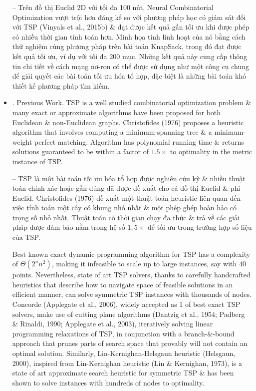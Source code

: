 \documentclass{article}
\begin{document}
\begin{itemize}
    -- Trên đồ thị Euclid 2D với tối đa 100 nút, Neural Combinatorial Optimization vượt trội hơn đáng kể so với phương pháp học có giám sát đối với TSP (Vinyals et al., 2015b) \& đạt được kết quả gần tối ưu khi được phép có nhiều thời gian tính toán hơn. Minh họa tính linh hoạt của nó bằng cách thử nghiệm cùng phương pháp trên bài toán KnapSack, trong đó đạt được kết quả tối ưu, ví dụ với tối đa 200 mục. Những kết quả này cung cấp thông tin chi tiết về cách mạng nơ-ron có thể được sử dụng như một công cụ chung để giải quyết các bài toán tối ưu hóa tổ hợp, đặc biệt là những bài toán khó thiết kế phương pháp tìm kiếm.
    \item {. Previous Work.} TSP is a well studied combinatorial optimization problem \& many exact or approximate algorithms have been proposed for both Euclidean \& non-Euclidean graphs. Christofides (1976) proposes a heuristic algorithm that involves computing a minimum-spanning tree \& a minimum-weight perfect matching. Algorithm has polynomial running time \& returns solutions guaranteed to be within a factor of $1.5\times$ to optimality in the metric instance of TSP.
    
    -- TSP là một bài toán tối ưu hóa tổ hợp được nghiên cứu kỹ \& nhiều thuật toán chính xác hoặc gần đúng đã được đề xuất cho cả đồ thị Euclid \& phi Euclid. Christofides (1976) đề xuất một thuật toán heuristic liên quan đến việc tính toán một cây có khung nhỏ nhất \& một phép ghép hoàn hảo có trọng số nhỏ nhất. Thuật toán có thời gian chạy đa thức \& trả về các giải pháp được đảm bảo nằm trong hệ số $1,5\times$ để tối ưu trong trường hợp số liệu của TSP.
    
    Best known exact dynamic programming algorithm for TSP has a complexity of $\Theta(2^nn^2)$, making it infeasible to scale up to large instances, say with 40 points. Nevertheless, state of art TSP solvers, thanks to carefully handcrafted heuristics that describe how to navigate space of feasible solutions in an efficient manner, can solve symmetric TSP instances with thousands of nodes. Concorde (Applegate et al., 2006), widely accepted as 1 of best exact TSP solvers, make use of cutting plane algorithms (Dantzig et al., 1954; Padberg \& Rinaldi, 1990; Applegate et al., 2003), iteratively solving linear programming relaxations of TSP, in conjunction with a branch-\&-bound approach that prunes parts of search space that provably will not contain an optimal solution. Similarly, Lin-Kernighan-Helsgaun heuristic (Helsgaun, 2000), inspired from Lin-Kernighan heuristic (Lin \& Kernighan, 1973), is a state of art approximate search heuristic for symmetric TSP \& has been shown to solve instances with hundreds of nodes to optimality.
    

\end{itemize}
\end{document}
